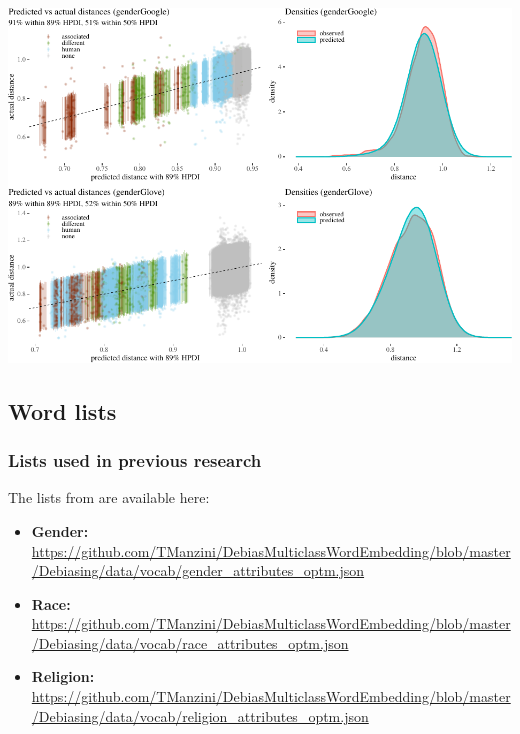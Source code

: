 \documentclass{clv3}
\begin{document}
\begin{center}\includegraphics[width=1\linewidth]{figures/figposteriorPrCheckAppendixd} \end{center}

\pagebreak 

\hypertarget{word-lists}{%
\subsection{Word lists}\label{word-lists}}

\label{appendix:word}

\hypertarget{lists-used-in-previous-research}{%
\subsubsection{Lists used in previous
research}\label{lists-used-in-previous-research}}

\label{appendix:manzini_word_lists} The lists from \citet{Manzini2019blackToCriminal} are
available here:

\begin{itemize}
\item
  \textbf{Gender:}
  \url{https://github.com/TManzini/DebiasMulticlassWordEmbedding/blob/master/Debiasing/data/vocab/gender_attributes_optm.json}
\item
  \textbf{Race:}
  \url{https://github.com/TManzini/DebiasMulticlassWordEmbedding/blob/master/Debiasing/data/vocab/race_attributes_optm.json}
\item
  \textbf{Religion:}
  \url{https://github.com/TManzini/DebiasMulticlassWordEmbedding/blob/master/Debiasing/data/vocab/religion_attributes_optm.json}
\end{itemize}
\end{document}
